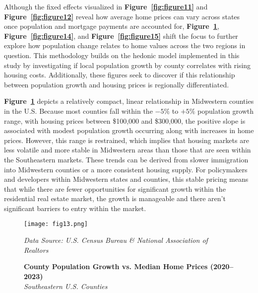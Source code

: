 \documentclass[journal,article,submit,pdftex,moreauthors]{Definitions/mdpi}
\begin{document}
Although the fixed effects visualized in \textbf{Figure~\ref{fig:figure11}} and \textbf{Figure~\ref{fig:figure12}} reveal how average home prices can vary across states once population and mortgage payments are accounted for, \textbf{Figure~\ref{fig:figure13}}, \textbf{Figure~\ref{fig:figure14}}, and \textbf{Figure~\ref{fig:figure15}} shift the focus to further explore how population change relates to home values across the two regions in question. This methodology builds on the hedonic model implemented in this study by investigating if local population growth by county correlates with rising housing costs. Additionally, these figures seek to discover if this relationship between population growth and housing prices is regionally differentiated.
 
\textbf{Figure~\ref{fig:figure13}} depicts a relatively compact, linear relationship in Midwestern counties in the U.S. Because most counties fall within the $-5\%$ to $+5\%$ population growth range, with housing prices between \$100{,}000 and \$300{,}000, the positive slope is associated with modest population growth occurring along with increases in home prices. However, this range is restrained, which implies that housing markets are less volatile and more stable in Midwestern areas than those that are seen within the Southeastern markets. These trends can be derived from slower immigration into Midwestern counties or a more consistent housing supply. For policymakers and developers within Midwestern states and counties, this stable pricing means that while there are fewer opportunities for significant growth within the residential real estate market, the growth is manageable and there aren’t significant barriers to entry within the market.

\begin{figure}[H]
  \centering
  \texttt{[image: fig13.png]}
  \caption{\textbf{County Population Growth vs. Median Home Prices (2020–2023)}\\
  \textit{Southeastern U.S. Counties}}
  \label{fig:figure13}
  \vspace{1ex}
  {\footnotesize\textit{Data Source: U.S. Census Bureau \& National Association of Realtors}}
\end{figure}
 
\end{document}
